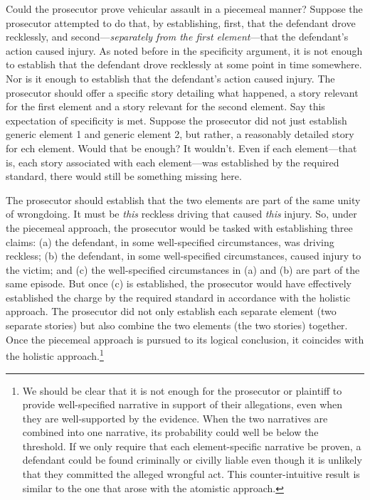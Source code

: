 \documentclass[
  10pt,
  dvipsnames,enabledeprecatedfontcommands]{scrartcl}
\begin{document}
Could the prosecutor prove vehicular assault in a piecemeal manner?
Suppose the prosecutor attempted to do that, by establishing, first,
that the defendant drove recklessly, and second---\emph{separately from
the first element}---that the defendant's action caused injury. As noted
before in the specificity argument, it is not enough to establish that
the defendant drove recklessly at some point in time somewhere. Nor is
it enough to establish that the defendant's action caused injury. The
prosecutor should offer a specific story detailing what happened, a
story relevant for the first element and a story relevant for the second
element. Say this expectation of specificity is met. Suppose the
prosecutor did not just establish generic element 1 and generic element
2, but rather, a reasonably detailed story for ech element. Would that
be enough? It wouldn't. Even if each element---that is, each story
associated with each element---was established by the required standard,
there would still be something missing here.

The prosecutor should establish that the two elements are part of the
same unity of wrongdoing. It must be \emph{this} reckless driving that
caused \emph{this} injury. So, under the piecemeal approach, the
prosecutor would be tasked with establishing three claims: (a) the
defendant, in some well-specified circumstances, was driving reckless;
(b) the defendant, in some well-specified circumstances, caused injury
to the victim; and (c) the well-specified circumstances in (a) and (b)
are part of the same episode. But once (c) is established, the
prosecutor would have effectively established the charge by the required
standard in accordance with the holistic approach. The prosecutor did
not only establish each separate element (two separate stories) but also
combine the two elements (the two stories) together. Once the piecemeal
approach is pursued to its logical conclusion, it coincides with the
holistic approach.\footnote{We should be clear that it is not enough for
  the prosecutor or plaintiff to provide well-specified narrative in
  support of their allegations, even when they are well-supported by the
  evidence. When the two narratives are combined into one narrative, its
  probability could well be below the threshold. If we only require that
  each element-specific narrative be proven, a defendant could be found
  criminally or civilly liable even though it is unlikely that they
  committed the alleged wrongful act. This counter-intuitive result is
  similar to the one that arose with the atomistic approach.}
\end{document}
